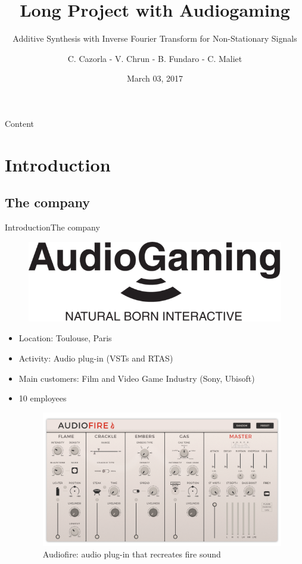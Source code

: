 \documentclass{bredelebeamer}
\title[Long Project with Audiogaming]{Long Project with Audiogaming}
\subtitle{Additive Synthesis with Inverse Fourier Transform for Non-Stationary Signals }
\author{ \hspace{0.3cm} C. Cazorla - V. Chrun - B. Fundaro - C. Maliet \hspace{0.3cm} }
\institute[Audiogaming Supervisor ]
{
  \normalsize Audiogaming Supervisor : \\
 \normalsize Chunghsin Yeh
  }
\date{March 03, 2017}
\begin{document}
\begin{frame}
  \titlepage
\end{frame}




\begin{frame}{Content}
  \tableofcontents
\end{frame}

\section{Introduction}
\subsection{The company}
\begin{frame}{Introduction}{The company}
	\begin{figure}
   	 \centering
  	 \includegraphics[scale=0.12]{ag.png}
	 \end{figure}
  \begin{itemize}
  \item<1-> Location: Toulouse, Paris
  \item<1-> Activity: Audio plug-in (VSTs and RTAS)
  \item<1-> Main customers: Film and Video Game Industry (Sony, Ubisoft)
  \item<1-> 10 employees
	\begin{figure}
	\includegraphics[scale=0.12]{AudioFire_screen.png}
	\caption{Audiofire: audio plug-in that recreates fire sound}
	\end{figure}
  \end{itemize}
\end{frame}
\end{document}
